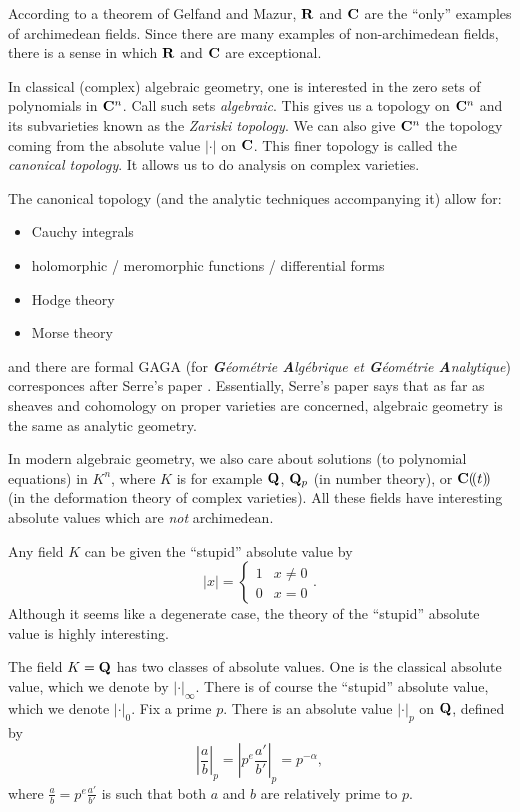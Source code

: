 According to a theorem of Gelfand and Mazur, $\mathbf{R}$ and $\mathbf{C}$ are the ``only'' 
examples of archimedean fields. Since there are many examples of 
non-archimedean fields, there is a sense in which $\mathbf{R}$ and $\mathbf{C}$ are 
exceptional. 

\begin{example_}
In classical (complex) algebraic geometry, one is interested in the zero sets 
of polynomials in $\mathbf{C}^n$. Call such sets \emph{algebraic}. This gives us a 
topology on $\mathbf{C}^n$ and its subvarieties known as the \emph{Zariski topology}. 
We can also give $\mathbf{C}^n$ the topology coming from the absolute value $|\cdot|$ 
on $\mathbf{C}$. This finer topology is called the \emph{canonical topology}. It 
allows us to do analysis on complex varieties. 
\end{example_}

The canonical topology (and the analytic techniques accompanying it) allow for: 
\begin{itemize}
  \item Cauchy integrals
  \item holomorphic / meromorphic functions / differential forms
  \item Hodge theory
  \item Morse theory
\end{itemize}
and there are formal GAGA (for \emph{\textbf{G}\'eom\'etrie \textbf{A}lg\'ebrique et \textbf{G}\'eom\'etrie 
\textbf{A}nalytique}) corresponces after Serre's paper \cite{serre-1956}. Essentially, Serre's 
paper says that as far as sheaves and cohomology on proper varieties are 
concerned, algebraic geometry is the same as analytic geometry. 

In modern algebraic geometry, we also care about solutions (to polynomial 
equations) in $K^n$, where $K$ is for example $\mathbf{Q}$, $\mathbf{Q}_p$ (in number 
theory), or $\mathbf{C}(\!( t)\!)$ (in the deformation theory of complex varieties). 
All these fields have interesting absolute values which are \emph{not} 
archimedean.

\begin{example_}
Any field $K$ can be given the ``stupid'' absolute value by 
\[
  |x| = \begin{cases} 1 & x\ne 0 \\ 0 & x=0 \end{cases} .
\]
Although it seems like a degenerate case, the theory of the ``stupid'' 
absolute value is highly interesting. 
\end{example_}

\begin{example_}
The field $K=\mathbf{Q}$ has two classes of absolute values. One is the classical 
absolute value, which we denote by $|\cdot|_\infty$. There is of course the 
``stupid'' absolute value, which we denote $|\cdot|_0$. Fix a prime $p$. There 
is an absolute value $|\cdot|_p$ on $\mathbf{Q}$, defined by 
\[
  \left|\frac a b\right|_p = \left|p^e \frac{a'}{b'}\right|_p = p^{-\alpha} ,
\]
where $\frac a b=p^e \frac{a'}{b'}$ is such that both $a$ and $b$ are 
relatively prime to $p$. 
\end{example_}

